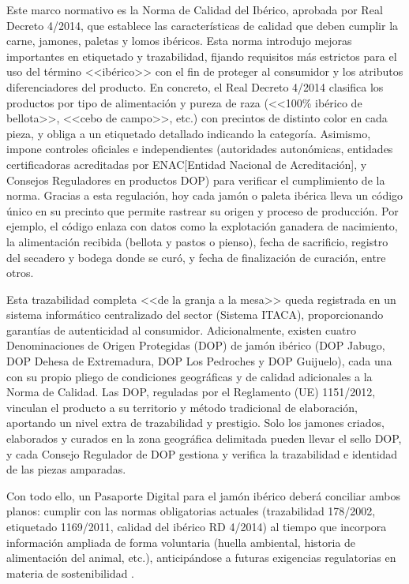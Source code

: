 Este marco normativo es la Norma de Calidad del Ibérico, aprobada por Real Decreto 4/2014, que establece las características de calidad que deben cumplir la carne, jamones, paletas y lomos ibéricos. Esta norma introdujo mejoras importantes en etiquetado y trazabilidad, fijando requisitos más estrictos para el uso del término <<ibérico>> con el fin de proteger al consumidor y los atributos diferenciadores del producto. En concreto, el Real Decreto 4/2014 clasifica los productos por tipo de alimentación y pureza de raza (<<100\% ibérico de bellota>>, <<cebo de campo>>, etc.) con precintos de distinto color en cada pieza, y obliga a un etiquetado detallado indicando la categoría. Asimismo, impone controles oficiales e independientes (autoridades autonómicas, entidades certificadoras acreditadas por ENAC[Entidad Nacional de Acreditación], y Consejos Reguladores en productos DOP) para verificar el cumplimiento de la norma. Gracias a esta regulación, hoy cada jamón o paleta ibérica lleva un código único en su precinto que permite rastrear su origen y proceso de producción. Por ejemplo, el código enlaza con datos como la explotación ganadera de nacimiento, la alimentación recibida (bellota y pastos o pienso), fecha de sacrificio, registro del secadero y bodega donde se curó, y fecha de finalización de curación, entre otros.

Esta trazabilidad completa <<de la granja a la mesa>> queda registrada en un sistema informático centralizado del sector (Sistema ITACA), proporcionando garantías de autenticidad al consumidor. Adicionalmente, existen cuatro Denominaciones de Origen Protegidas (DOP) de jamón ibérico (DOP Jabugo, DOP Dehesa de Extremadura, DOP Los Pedroches y DOP Guijuelo), cada una con su propio pliego de condiciones geográficas y de calidad adicionales a la Norma de Calidad. Las DOP, reguladas por el Reglamento (UE) 1151/2012, vinculan el producto a su territorio y método tradicional de elaboración, aportando un nivel extra de trazabilidad y prestigio. Solo los jamones criados, elaborados y curados en la zona geográfica delimitada pueden llevar el sello DOP, y cada Consejo Regulador de DOP gestiona y verifica la trazabilidad e identidad de las piezas amparadas.

Con todo ello, un Pasaporte Digital para el jamón ibérico deberá conciliar ambos planos: cumplir con las normas obligatorias actuales (trazabilidad 178/2002, etiquetado 1169/2011, calidad del ibérico RD 4/2014) al tiempo que incorpora información ampliada de forma voluntaria (huella ambiental, historia de alimentación del animal, etc.), anticipándose a futuras exigencias regulatorias en materia de sostenibilidad \cite{BOEesDOUEL200280201Reglamento}\cite{BOEA2014318RealDecreto}\cite{ministeriodeagriculturapescayalimentacionespanaPliegoCondicionesDenominacion2022}.

